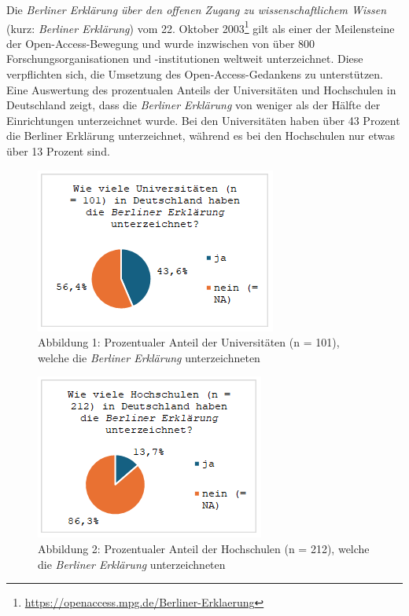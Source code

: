 \documentclass[a4paper,
fontsize=11pt,
oneside,
numbers=noperiodatend,
parskip=half-,
bibliography=totoc,
final
]{scrartcl}
\begin{document}
Die \emph{Berliner Erklärung über den offenen Zugang zu
wissenschaftlichem Wissen} (kurz: \emph{Berliner Erklärung}) vom 22.
Oktober 2003\footnote{\url{https://openaccess.mpg.de/Berliner-Erklaerung}}
gilt als einer der Meilensteine der Open-Access-Bewegung und wurde
inzwischen von über 800 Forschungsorganisationen und -institutionen
weltweit unterzeichnet. Diese verpflichten sich, die Umsetzung des
Open-Access-Gedankens zu unterstützen. Eine Auswertung des prozentualen
Anteils der Universitäten und Hochschulen in Deutschland zeigt, dass die
\emph{Berliner Erklärung} von weniger als der Hälfte der Einrichtungen
unterzeichnet wurde. Bei den Universitäten haben über 43 Prozent die Berliner Erklärung unterzeichnet, während es bei den Hochschulen nur etwas über 13 Prozent sind.

\begin{figure}[H]
\centering
\includegraphics[]{img/image002.png}
\caption{Abbildung 1: Prozentualer Anteil der Universitäten (n = 101), welche die \emph{Berliner Erklärung} unterzeichneten}
\end{figure}

\begin{figure}[H]
\centering
\includegraphics[]{img/image001.png}
\caption{Abbildung 2: Prozentualer Anteil der Hochschulen (n = 212), welche die \emph{Berliner Erklärung} unterzeichneten}
\end{figure}
\end{document}
